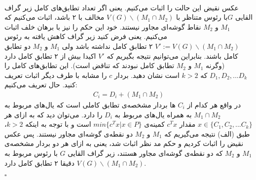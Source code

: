 \documentclass[a4paper,12pt]{article}
\begin{document}
\paragraph{\color{blue}}
عکس نقیض این حالت را اثبات می‌کنیم. یعنی اگر تعداد تطابق‌های کامل زیر گراف القایی $G$با رئوس متناظر با
$V(G) \backslash (M_1 \cap M_2)$
مخالف با ۲ باشد، اثبات می‌کنیم که $M_1$ و $M_2$ نقاط گوشه‌ای مجاور نیستند.
خود این حکم را نیز با برهان خلف اثبات می‌کنیم. یعنی فرض کنید زیر گراف کاهش یافته به رئوس
$V' := V(G) \backslash (M_1 \cap M_2)$
۲ تطابق کامل نداشته باشد ولی $M_1$ و $M_2$ دو تطابق کامل باشند. بنابراین می‌توانیم نتیجه بگیریم که
$V'$
اکیدا بیش از ۲ تطابق کامل دارد (وگرنه $M_1$ و $M_2$ تطابق کامل نبودند که تناقض است). این تطابق‌های کامل را 
$D_1, D_2, ... D_k$
که
$k > 2$
است نشان دهید.
بردار $c$ را مشابه با طرف دیگر اثبات تعریف کنید. 
حال تعریف می‌کنیم:
\begin{align*}
	C_i = D_i + (M_1 \cap M_2)
\end{align*}
در واقع هر کدام از $C_i$ ها بردار مشخصه‌ی تطابق کاملی است که یال‌های مربوط به $M_1 \cap M_2$ به همراه یال‌های مربوط به $D_i$ را دارد.
می‌توان دید که به ازای هر $x \in \{C_1,C_2,...C_k\}$  
مقدار
$c^Tx$
کمینه‌ی 
$min \{c^Tx | x \in P\}$
است و با توجه به اینکه $k > 2$، طبق (الف) نتیجه می‌گیریم که $M_1$ و $M_2$ دو نقطه‌ی گوشه‌ای مجاور نیستند. پس عکس نقیض را اثبات کردیم و حکم مد نظر اثبات شد، یعنی به ازای هر دو بردار مشخصه‌ی $M_1$ و $M_2$ که دو نقطه‌ی گوشه‌ای مجاور هستند، 
زیر گراف القایی $G$ با رئوس مربوط به $V(G) \backslash (M_1 \cap M_2)$ دقیقا ۲ تطابق کامل دارد.
\begin{latin}
	$\square$
\end{latin}
\end{document}
